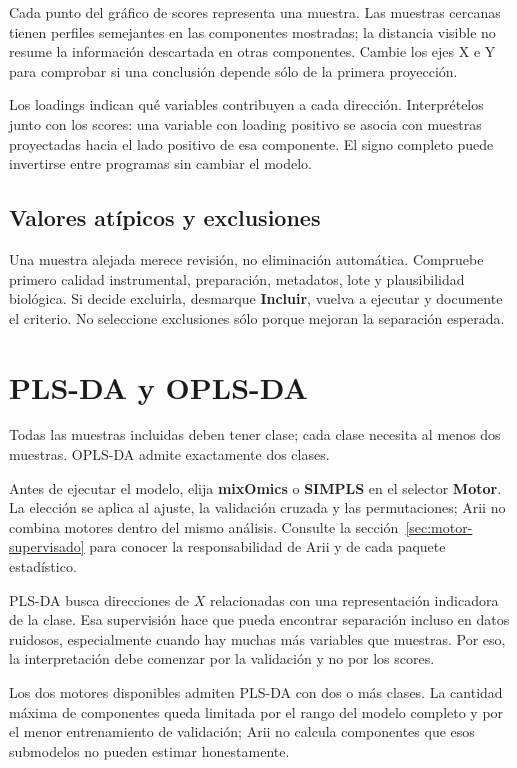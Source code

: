 \documentclass[11pt,a4paper,openany]{report}
\newcommand{\menu}[1]{\textbf{#1}}
\begin{document}
Cada punto del gráfico de scores representa una muestra. Las muestras cercanas
tienen perfiles semejantes en las componentes mostradas; la distancia visible
no resume la información descartada en otras componentes. Cambie los ejes X e Y
para comprobar si una conclusión depende sólo de la primera proyección.

Los loadings indican qué variables contribuyen a cada dirección. Interprételos
junto con los scores: una variable con loading positivo se asocia con muestras
proyectadas hacia el lado positivo de esa componente. El signo completo puede
invertirse entre programas sin cambiar el modelo.

\section{Valores atípicos y exclusiones}

Una muestra alejada merece revisión, no eliminación automática. Compruebe primero calidad instrumental, preparación, metadatos, lote y plausibilidad biológica. Si decide excluirla, desmarque \menu{Incluir}, vuelva a ejecutar y documente el criterio. No seleccione exclusiones sólo porque mejoran la separación esperada.

\chapter{PLS-DA y OPLS-DA}

Todas las muestras incluidas deben tener clase; cada clase necesita al menos dos
muestras. OPLS-DA admite exactamente dos clases.

Antes de ejecutar el modelo, elija \menu{mixOmics} o \menu{SIMPLS} en el
selector \menu{Motor}. La elección se aplica al ajuste, la validación cruzada y
las permutaciones; Arii no combina motores dentro del mismo análisis. Consulte
la sección~\ref{sec:motor-supervisado} para conocer la responsabilidad de Arii y
de cada paquete estadístico.

PLS-DA busca direcciones de $X$ relacionadas con una representación indicadora
de la clase. Esa supervisión hace que pueda encontrar separación incluso en datos ruidosos, especialmente cuando hay muchas más variables que muestras. Por eso, la interpretación debe comenzar por la validación y no por los scores.

Los dos motores disponibles admiten PLS-DA con dos o más clases. La cantidad
máxima de componentes queda limitada por el rango del modelo completo y por el
menor entrenamiento de validación; Arii no calcula componentes que esos
submodelos no pueden estimar honestamente.
\end{document}
